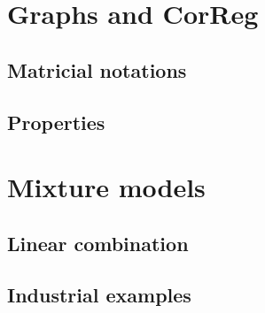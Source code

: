 \documentclass[11pt,a4paper]{report}
\begin{document}
	\chapter{Graphs and CorReg}
		\section{Matricial notations}
		\section{Properties}
	\chapter{Mixture models}
		\section{Linear combination}
			
		\section{Industrial examples}	
\end{document}

